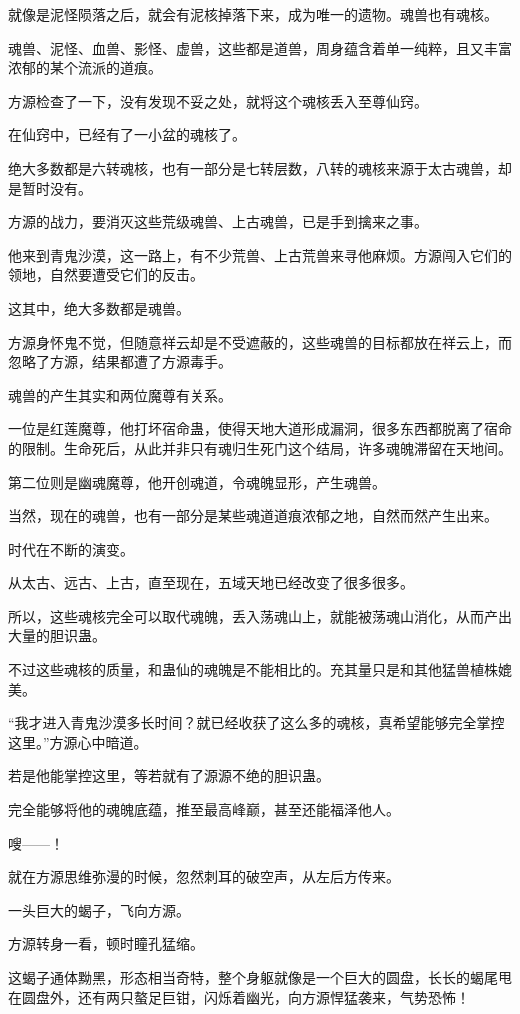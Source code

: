 \begin{this_body}
就像是泥怪陨落之后，就会有泥核掉落下来，成为唯一的遗物。魂兽也有魂核。

魂兽、泥怪、血兽、影怪、虚兽，这些都是道兽，周身蕴含着单一纯粹，且又丰富浓郁的某个流派的道痕。

方源检查了一下，没有发现不妥之处，就将这个魂核丢入至尊仙窍。

在仙窍中，已经有了一小盆的魂核了。

绝大多数都是六转魂核，也有一部分是七转层数，八转的魂核来源于太古魂兽，却是暂时没有。

方源的战力，要消灭这些荒级魂兽、上古魂兽，已是手到擒来之事。

他来到青鬼沙漠，这一路上，有不少荒兽、上古荒兽来寻他麻烦。方源闯入它们的领地，自然要遭受它们的反击。

这其中，绝大多数都是魂兽。

方源身怀鬼不觉，但随意祥云却是不受遮蔽的，这些魂兽的目标都放在祥云上，而忽略了方源，结果都遭了方源毒手。

魂兽的产生其实和两位魔尊有关系。

一位是红莲魔尊，他打坏宿命蛊，使得天地大道形成漏洞，很多东西都脱离了宿命的限制。生命死后，从此并非只有魂归生死门这个结局，许多魂魄滞留在天地间。

第二位则是幽魂魔尊，他开创魂道，令魂魄显形，产生魂兽。

当然，现在的魂兽，也有一部分是某些魂道道痕浓郁之地，自然而然产生出来。

时代在不断的演变。

从太古、远古、上古，直至现在，五域天地已经改变了很多很多。

所以，这些魂核完全可以取代魂魄，丢入荡魂山上，就能被荡魂山消化，从而产出大量的胆识蛊。

不过这些魂核的质量，和蛊仙的魂魄是不能相比的。充其量只是和其他猛兽植株媲美。

“我才进入青鬼沙漠多长时间？就已经收获了这么多的魂核，真希望能够完全掌控这里。”方源心中暗道。

若是他能掌控这里，等若就有了源源不绝的胆识蛊。

完全能够将他的魂魄底蕴，推至最高峰巅，甚至还能福泽他人。

嗖——！

就在方源思维弥漫的时候，忽然刺耳的破空声，从左后方传来。

一头巨大的蝎子，飞向方源。

方源转身一看，顿时瞳孔猛缩。

这蝎子通体黝黑，形态相当奇特，整个身躯就像是一个巨大的圆盘，长长的蝎尾甩在圆盘外，还有两只螯足巨钳，闪烁着幽光，向方源悍猛袭来，气势恐怖！


\end{this_body}
